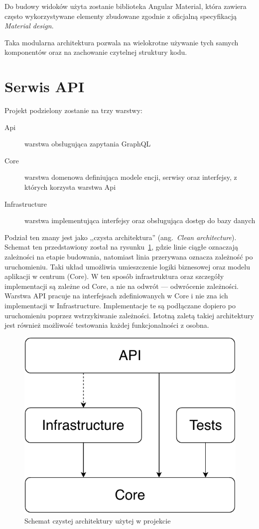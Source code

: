 	Do budowy widoków użyta zostanie biblioteka Angular Material,
	która zawiera często wykorzystywane elementy zbudowane zgodnie z oficjalną specyfikacją \emph{Material design}.

	Taka modularna architektura pozwala na wielokrotne używanie tych samych komponentów oraz na zachowanie czytelnej struktury kodu.

\section{Serwis API}
	Projekt podzielony zostanie na trzy warstwy:
	\begin{description}
		\item[Api] warstwa obsługująca zapytania GraphQL
		\item[Core] warstwa domenowa definiująca modele encji, serwisy oraz interfejsy, z których korzysta warstwa Api
		\item[Infrastructure] warstwa implementująca interfejsy oraz obsługująca dostęp do bazy danych
	\end{description}

	Podział ten znany jest jako ,,czysta architektura'' (ang.\ \emph{Clean architecture}).
	Schemat ten przedstawiony został na rysunku~\ref{fig:cleanArch},
	gdzie linie ciągłe oznaczają zależności na etapie budowania, natomiast linia przerywana oznacza zależność po uruchomieniu.
	Taki układ umożliwia umieszczenie logiki biznesowej oraz modelu aplikacji w centrum (Core).
	W ten sposób infrastruktura oraz szczegóły implementacji są zależne od Core, a nie na odwrót --- odwrócenie zależności.
	Warstwa API pracuje na interfejsach zdefiniowanych w Core i nie zna ich implementacji w Infrastructure.
	Implementacje te są podłączane dopiero po uruchomieniu poprzez wstrzykiwanie zależności.
	Istotną zaletą takiej architektury jest również możliwość testowania każdej funkcjonalności z osobna.

	\begin{figure}[ht]
		\centering
			\includegraphics[width=0.3\linewidth]{rys03/CleanArch.pdf}
		 \caption{Schemat czystej architektury użytej w projekcie}
		 \label{fig:cleanArch}
	\end{figure}

